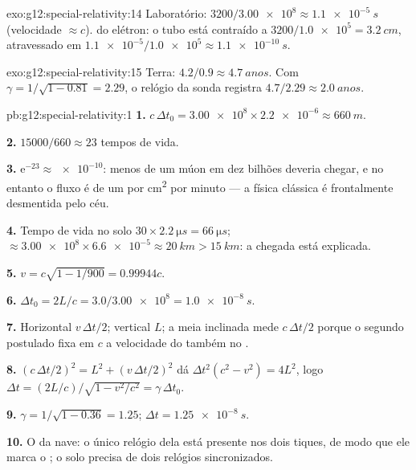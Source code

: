 \begin{solution}{exo:g12:special-relativity:14}
Laboratório: $3200/\num{3.00e8} \approx \qty{1.1e-5}{s}$ (velocidade
$\approx c$).  do elétron: o tubo está contraído a
$3200/\num{1.0e5} = \qty{3.2}{cm}$, atravessado em
$\num{1.1e-5}/\num{1.0e5} \approx \qty{1.1e-10}{s}$.
\end{solution}

\begin{solution}{exo:g12:special-relativity:15}
Terra: $4.2/0.9 \approx \qty{4.7}{anos}$. Com
$\gamma = 1/\sqrt{1 - 0.81} = 2.29$, o relógio da sonda registra
$4.7/2.29 \approx \qty{2.0}{anos}$.
\end{solution}

\begin{solution}{pb:g12:special-relativity:1}
\textbf{1.} $c\,\Delta t_0 = \num{3.00e8} \times \num{2.2e-6} \approx
\qty{660}{m}$.

\textbf{2.} $\num{15000}/660 \approx 23$ tempos de vida.

\textbf{3.} $\mathrm{e}^{-23} \approx \num{e-10}$: menos de um múon em
dez bilhões deveria chegar, e no entanto o fluxo é de um por \unit{cm^2}
por minuto --- a física clássica é frontalmente desmentida pelo céu.

\textbf{4.} Tempo de vida no solo
$30 \times \qty{2.2}{\micro s} = \qty{66}{\micro s}$; 
$\approx \num{3.00e8} \times \num{6.6e-5} \approx \qty{20}{km} >
\qty{15}{km}$: a chegada está explicada.

\textbf{5.} $v = c\sqrt{1 - 1/900} = 0.99944c$.

\textbf{6.} $\Delta t_0 = 2L/c = 3.0/\num{3.00e8} = \qty{1.0e-8}{s}$.

\textbf{7.} Horizontal $v\,\Delta t/2$; vertical $L$; a meia 
inclinada mede $c\,\Delta t/2$ porque o segundo postulado fixa em $c$ a
velocidade do  também no .

\textbf{8.} $(c\,\Delta t/2)^2 = L^2 + (v\,\Delta t/2)^2$ dá
$\Delta t^2(c^2 - v^2) = 4L^2$, logo
$\Delta t = (2L/c)/\sqrt{1 - v^2/c^2} = \gamma\,\Delta t_0$.

\textbf{9.} $\gamma = 1/\sqrt{1 - 0.36} = 1.25$;
$\Delta t = \qty{1.25e-8}{s}$.

\textbf{10.} O da nave: o único relógio dela está presente nos dois
tiques, de modo que ele marca o ; o solo precisa de dois
relógios sincronizados.


\end{solution}
